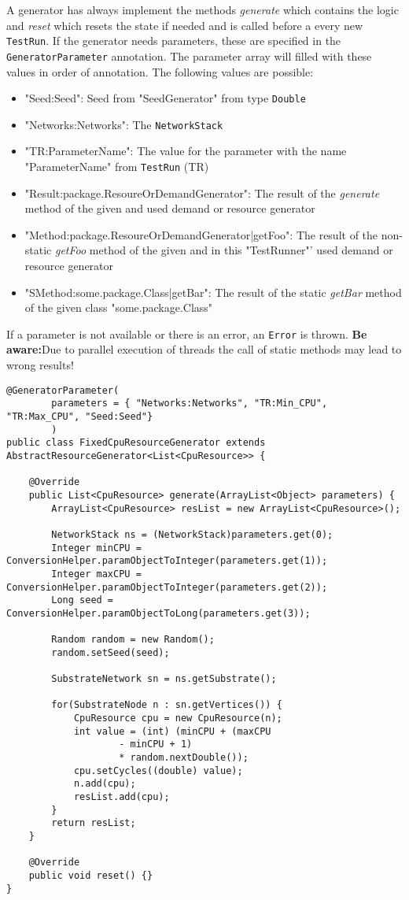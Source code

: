 A generator has always implement the methods \textsl{generate} which contains the logic and \textsl{reset} 
which resets the state if needed and is called before a every new \texttt{TestRun}.
If the generator needs parameters, these are specified in the \texttt{GeneratorParameter} annotation.
The parameter array will filled with these values in order of annotation.
The following values are possible:
\begin{itemize}
	\item "Seed:Seed": Seed from "SeedGenerator" from type \texttt{Double}
	\item "Networks:Networks": The \texttt{NetworkStack}
	\item "TR:ParameterName": The value for the parameter with the name "ParameterName" from \texttt{TestRun} (TR)
	\item "Result:package.ResoureOrDemandGenerator": The result of the \textsl{generate} method of the given and used demand or resource generator
	\item "Method:package.ResoureOrDemandGenerator|getFoo": The result of the non-static \textsl{getFoo} method of the given and in this "TestRunner"' used demand or resource generator
	\item "SMethod:some.package.Class|getBar": The result of the static \textsl{getBar} method of the given class "some.package.Class"
 \end{itemize}

If a parameter is not available or there is an error, an \texttt{Error} is thrown.
\textbf{Be aware:}Due to parallel execution of threads the call of static methods may lead to wrong results!


\begin{lstlisting}
@GeneratorParameter(
		parameters = { "Networks:Networks", "TR:Min_CPU", "TR:Max_CPU", "Seed:Seed"}
		)
public class FixedCpuResourceGenerator extends AbstractResourceGenerator<List<CpuResource>> {

	@Override
	public List<CpuResource> generate(ArrayList<Object> parameters) {
		ArrayList<CpuResource> resList = new ArrayList<CpuResource>();
		
		NetworkStack ns = (NetworkStack)parameters.get(0);
		Integer minCPU = ConversionHelper.paramObjectToInteger(parameters.get(1));
		Integer maxCPU = ConversionHelper.paramObjectToInteger(parameters.get(2));
		Long seed = ConversionHelper.paramObjectToLong(parameters.get(3));
		
		Random random = new Random();
		random.setSeed(seed);
		
		SubstrateNetwork sn = ns.getSubstrate();
		
		for(SubstrateNode n : sn.getVertices()) {
			CpuResource cpu = new CpuResource(n);
			int value = (int) (minCPU + (maxCPU
					- minCPU + 1)
					* random.nextDouble());
			cpu.setCycles((double) value);
			n.add(cpu);
			resList.add(cpu);
		}
		return resList;
	}

	@Override
	public void reset() {}
}
\end{lstlisting}
